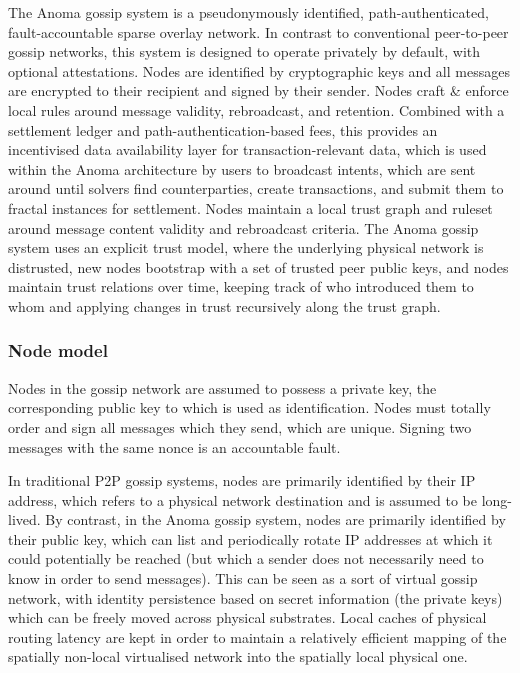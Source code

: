 \documentclass[
    9pt,            %
    commun,        %
    affiltop,       %
]{art}
\begin{document}
The Anoma gossip system is a pseudonymously identified,
path-authenticated, fault-accountable sparse overlay network. In
contrast to conventional peer-to-peer gossip networks, this system is
designed to operate privately by default, with optional attestations.
Nodes are identified by cryptographic keys and all messages are
encrypted to their recipient and signed by their sender. Nodes craft \&
enforce local rules around message validity, rebroadcast, and retention.
Combined with a settlement ledger and path-authentication-based fees,
this provides an incentivised data availability layer for
transaction-relevant data, which is used within the Anoma architecture
by users to broadcast intents, which are sent around until solvers find
counterparties, create transactions, and submit them to fractal
instances for settlement. Nodes maintain a local trust graph and ruleset
around message content validity and rebroadcast criteria. The Anoma
gossip system uses an explicit trust model, where the underlying
physical network is distrusted, new nodes bootstrap with a set of
trusted peer public keys, and nodes maintain trust relations over time,
keeping track of who introduced them to whom and applying changes in
trust recursively along the trust graph.

\subsubsection{Node model}\label{node-model}

Nodes in the gossip network are assumed to possess a private key, the
corresponding public key to which is used as identification. Nodes must
totally order and sign all messages which they send, which are unique.
Signing two messages with the same nonce is an accountable fault.

In traditional P2P gossip systems, nodes are primarily identified by
their IP address, which refers to a physical network destination and is
assumed to be long-lived. By contrast, in the Anoma gossip system, nodes
are primarily identified by their public key, which can list and
periodically rotate IP addresses at which it could potentially be
reached (but which a sender does not necessarily need to know in order
to send messages). This can be seen as a sort of virtual gossip network,
with identity persistence based on secret information (the private keys)
which can be freely moved across physical substrates. Local caches of
physical routing latency are kept in order to maintain a relatively
efficient mapping of the spatially non-local virtualised network into
the spatially local physical one.
\end{document}
